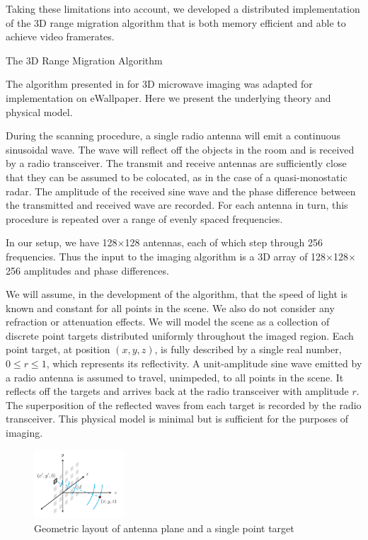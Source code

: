 \documentclass[twocolumn]{article}
\makeatletter
\def\section{\@startsection{section}{1}{\z@}{24pt plus 2 pt
minus 2 pt} {12pt plus 2pt minus 2pt}{\large\bf}}
\makeatother
\begin{document}
Taking these limitations into account, we developed a distributed implementation of the 3D range migration algorithm that is both memory efficient and able to achieve video framerates.

\section{The 3D Range Migration Algorithm}
\label{algorithm-section}

The algorithm presented in \cite{lopez20003} for 3D microwave imaging was adapted for implementation on eWallpaper. Here we present the underlying theory and physical model. 

During the scanning procedure, a single radio antenna will emit a continuous sinusoidal wave. The wave will reflect off the objects in the room and is received by a radio transceiver. The transmit and receive antennas are sufficiently close that they can be assumed to be colocated, as in the case of a quasi-monostatic radar. The amplitude of the received sine wave and the phase difference between the transmitted and received wave are recorded. For each antenna in turn, this procedure is repeated over a range of evenly spaced frequencies. 

In our setup, we have 128$\times$128 antennas, each of which step through 256 frequencies. Thus the input to the imaging algorithm is a 3D array of 128$\times$128$\times$256 amplitudes and phase differences.

We will assume, in the development of the algorithm, that the speed of light is known and constant for all points in the scene. We also do not consider any refraction or attenuation effects. We will model the scene as a collection of discrete point targets distributed uniformly throughout the imaged region. Each point target, at position $(x,y,z)$, is fully described by a single real number, $0 \leq r \leq 1$, which represents its reflectivity. A unit-amplitude sine wave emitted by a radio antenna is assumed to travel, unimpeded, to all points in the scene. It reflects off the targets and arrives back at the radio transceiver with amplitude $r$. The superposition of the reflected waves from each target is recorded by the radio transceiver. This physical model is minimal but is sufficient for the purposes of imaging.

\begin{figure}[!h]
\centering
\includegraphics*[width=0.3\textwidth]{figures/antenna.pdf}
\caption{Geometric layout of antenna plane and a single point target}
\label{antenna}
\end{figure}
\end{document}
